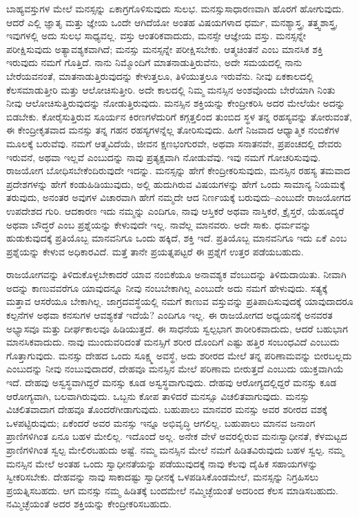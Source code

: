 \vskip 5pt

ಬಾಹ್ಯವಸ್ತುಗಳ ಮೇಲೆ ಮನಸ್ಸನ್ನು ಏಕಾಗ್ರಗೊಳಿಸುವುದು ಸುಲಭ. ಮನಸ್ಸು\break ಸಾಧಾರಣವಾಗಿ ಹೊರಗೆ ಹೋಗುವುದು. ಆದರೆ ಎಲ್ಲಿ ಜ್ಞಾತೃ ಮತ್ತು ಜ್ಞೇಯ ಒಂದೇ ಆಗಿದೆಯೋ ಅಂತಹ ವಿಷಯಗಳಾದ ಧರ್ಮ, ಮನಶ್ಯಾಸ್ತ್ರ, ತತ್ತ್ವಶಾಸ್ತ್ರ, ಇವುಗಳಲ್ಲಿ ಅದು ಸುಲಭ ಸಾಧ್ಯವಲ್ಲ. ವಸ್ತು ಆಂತರಿಕವಾದುದು, ಮನಸ್ಸೇ ಆಜ್ಞೇಯ ವಸ್ತು. ಮನಸ್ಸನ್ನೇ ಪರೀಕ್ಷಿಸುವುದು ಅತ್ಯಾವಶ್ಯಕವಾಗಿದೆ; ಮನಸ್ಸು ಮನಸ್ಸನ್ನೇ ಪರೀಕ್ಷಿಸಬೇಕು. ಆತ್ಮಚಿಂತನೆ ಎಂಬ ಮಾನಸಿಕ ಶಕ್ತಿ ಇರುವುದು ನಮಗೆ ಗೊತ್ತಿದೆ. ನಾನು ನಿಮ್ಮೊಂದಿಗೆ ಮಾತನಾಡುತ್ತಿರುವೆನು, ಅದೇ ಸಮಯದಲ್ಲಿ ನಾನು ಬೇರೆಯವನಂತೆ, ಮಾತನಾಡುತ್ತಿರುವುದನ್ನು ಕೇಳುತ್ತಲೂ, ತಿಳಿಯುತ್ತಲೂ ಇರುವೆನು. ನೀವು ಏಕಕಾಲದಲ್ಲಿ ಕೆಲಸಮಾಡುತ್ತೀರಿ ಮತ್ತು ಆಲೋಚಿಸುತ್ತೀರಿ. ಅದೇ ಕಾಲದಲ್ಲಿ ನಿಮ್ಮ ಮನಸ್ಸಿನ ಅಂಶವೊಂದು ಬೇರೆಯಾಗಿ ನಿಂತು ನೀವು ಆಲೋಚಿಸುತ್ತಿರುವುದನ್ನು ನೋಡುತ್ತಿರುವುದು. ಮನಸ್ಸಿನ ಶಕ್ತಿಯನ್ನು ಕೇಂದ್ರೀಕರಿಸಿ ಅದರ ಮೇಲೆಯೇ ಅದನ್ನು ಬಿಡಬೇಕು. ಕೋರೈಸುತ್ತಿರುವ ಸೂರ್ಯನ ಕಿರಣಗಳೆದುರಿಗೆ ಕಗ್ಗತ್ತಲಿಂದ ತುಂಬಿದ ಸ್ಥಳ ತನ್ನ ರಹಸ್ಯವನ್ನು ತೋರುವಂತೆ, ಈ ಕೇಂದ್ರೀಕೃತವಾದ ಮನಸ್ಸು ತನ್ನ ಗಹನ ರಹಸ್ಯಗಳನ್ನೆಲ್ಲ ತೋರಿಸುವುದು. ಹೀಗೆ ನಿಜವಾದ ಆಧ್ಯಾತ್ಮಿಕ ನಂಬಿಕೆಗಳ ಮೂಲಕ್ಕೆ ಬರುವೆವು. ನಮಗೆ ಆತ್ಮವಿದೆಯೆ, ಜೀವನ ಕ್ಷಣಭಂಗುರವೇ, ಅಥವಾ ಸನಾತನವೇ, ಪ್ರಪಂಚದಲ್ಲಿ ದೇವರು ಇರುವನೆ, ಅಥವಾ ಇಲ್ಲವೆ ಎಂಬುದನ್ನು ನಾವು ಪ್ರತ್ಯಕ್ಷವಾಗಿ ನೋಡುವೆವು. ಇವು ನಮಗೆ ಗೋಚರಿಸುವುವು. ರಾಜಯೋಗ ಬೋಧಿಸಬೇಕೆಂದಿರುವುದೇ ಇದನ್ನು. ಮನಸ್ಸನ್ನು ಹೇಗೆ ಕೇಂದ್ರೀಕರಿಸುವುದು, ಮನಸ್ಸಿನ ರಹಸ್ಯ ತಮವಾದ ಪ್ರದೇಶಗಳನ್ನು ಹೇಗೆ ಕಂಡುಹಿಡಿಯುವುದು, ಅಲ್ಲಿ ಹುದುಗಿರುವ ವಿಷಯಗಳನ್ನು ಹೇಗೆ ಒಂದು ಸಾಮಾನ್ಯ ನಿಯಮಕ್ಕೆ ತರುವುದು, ಅನಂತರ ಅವುಗಳ ವಿಚಾರವಾಗಿ ಹೇಗೆ ನಮ್ಮದೇ ಆದ ನಿರ್ಣಯಕ್ಕೆ ಬರುವುದು–ಎಂಬುದೇ ರಾಜಯೋಗದ ಉಪದೇಶದ ಗುರಿ. ಆದಕಾರಣ ಇದು ನಮ್ಮನ್ನು ಎಂದಿಗೂ, ನಾವು ಆಸ್ತಿಕರೆ ಅಥವಾ ನಾಸ್ತಿಕರೆ, ಕ್ರೈಸ್ತರೆ, ಯೆಹೂದ್ಯರೆ ಅಥವಾ ಬೌದ್ಧರೆ ಎಂಬ ಪ್ರಶ್ನೆಯನ್ನು ಕೇಳುವುದೇ ಇಲ್ಲ. ನಾವೆಲ್ಲ ಮಾನವರು. ಅದೇ ಸಾಕು. ಧರ್ಮವನ್ನು ಹುಡುಕುವುದಕ್ಕೆ ಪ್ರತಿಯೊಬ್ಬ ಮಾನವನಿಗೂ ಒಂದು ಹಕ್ಕಿದೆ, ಶಕ್ತಿ ಇದೆ. ಪ್ರತಿಯೊಬ್ಬ ಮಾನವನಿಗೂ ಇದು ಏಕೆ ಎಂಬ ಪ್ರಶ್ನೆಯನ್ನು ಕೇಳುವ ಅಧಿಕಾರವಿದೆ. ಮತ್ತೆ ತಾನೇ ಪ್ರಯತ್ನಪಟ್ಟರೆ ಈ ಪ್ರಶ್ನೆಗೆ ಉತ್ತರ ಪಡೆಯಬಹುದು. 

\vskip 5pt

ರಾಜಯೋಗವನ್ನು ತಿಳಿದುಕೊಳ್ಳಬೇಕಾದರೆ ಯಾವ ನಂಬಿಕೆಯೂ ಅನಾವಶ್ಯಕ ವೆಂಬುದನ್ನು ತಿಳಿದುದಾಯಿತು. ನೀವಾಗಿ ಅದನ್ನು ಕಾಣುವವರೆಗೂ ಯಾವುದನ್ನೂ ನೀವು ನಂಬಬೇಕಾಗಿಲ್ಲ ಎಂಬುದೇ ಅದು ನಮಗೆ ಹೇಳುವುದು. ಸತ್ಯಕ್ಕೆ ಮತ್ತಾವ ಆಸರೆಯೂ ಬೇಕಾಗಿಲ್ಲ. ಜಾಗ್ರದವಸ್ಥೆಯಲ್ಲಿ ನಮಗೆ ಕಾಣುವ ವಸ್ತುವನ್ನು ಪ್ರತಿಪಾದಿಸುವುದಕ್ಕೆ ಯಾವುದಾದರೂ ಕಲ್ಪನೆಗಳ ಅಥವಾ ಕನಸುಗಳ ಆವಶ್ಯಕತೆ ಇದೆಯೆ? ಎಂದಿಗೂ ಇಲ್ಲ. ಈ ರಾಜಯೋಗದ ಅಧ್ಯಯನಕ್ಕೆ ಅನವರತ ಅಭ್ಯಾಸವೂ ಮತ್ತು ದೀರ್ಘಕಾಲವೂ ಹಿಡಿಯುತ್ತದೆ. ಈ ಸಾಧನೆಯ ಸ್ವಲ್ಪಭಾಗ ಶಾರೀರಿಕವಾದುದು, ಆದರೆ ಬಹುಭಾಗ ಮಾನಸಿಕವಾದುದು. ನಾವು ಮುಂದುವರಿದಂತೆ ಮನಸ್ಸಿಗೆ ಶರೀರ ದೊಂದಿಗೆ ಎಷ್ಟು ಹತ್ತಿರ ಸಂಬಂಧವಿದೆ ಎಂಬುದು ಗೊತ್ತಾಗುವುದು. ಮನಸ್ಸು ದೇಹದ ಒಂದು ಸೂಕ್ಷ್ಮ ಅವಸ್ಥೆ, ಅದು ಶರೀರದ ಮೇಲೆ ತನ್ನ ಪರಿಣಾಮವನ್ನು ಬೀರಬಲ್ಲದು ಎಂಬುದನ್ನು ನೀವು ನಂಬುವುದಾದರೆ, ದೇಹವೂ ಮನಸ್ಸಿನ ಮೇಲೆ ಪರಿಣಾಮ ಬೀರುತ್ತದೆ ಎಂಬುದು ಯುಕ್ತವಾಗಿಯೆ ಇದೆ. ದೇಹವು ಅಸ್ವಸ್ಥವಾಗಿದ್ದರೆ ಮನಸ್ಸು ಕೂಡ ಅಸ್ವಸ್ಥವಾಗುವುದು. ದೇಹವು ಆರೋಗ್ಯದಲ್ಲಿದ್ದರೆ ಮನಸ್ಸು ಕೂಡ ಆರೋಗ್ಯವಾಗಿ, ಬಲವಾಗಿರುವುದು. ಒಬ್ಬನು ಕೋಪ ತಾಳಿದರೆ ಮನಸ್ಸೂ ವಿಚಲಿತವಾಗುವುದು. ಮನಸ್ಸು ವಿಚಲಿತವಾದಾಗ ದೇಹವೂ ತೊಂದರೆಗೀಡಾಗುವುದು. ಬಹುಪಾಲು ಮಾನವರ ಮನಸ್ಸು ಅವರ ಶರೀರದ ವಶಕ್ಕೆ ಒಳಪಟ್ಟಿರುವುದು; ಏಕೆಂದರೆ ಅವರ ಮನಸ್ಸು ಇನ್ನೂ ಅಭಿವೃದ್ಧಿ ಆಗಲಿಲ್ಲ. ಬಹುಪಾಲು ಮಾನವ ಜನಾಂಗ ಪ್ರಾಣಿಗಳಿಗಿಂತ ಏನೂ ಬಹಳ ಮೇಲಿಲ್ಲ. ಇದೊಂದೆ ಅಲ್ಲ. ಅನೇಕ ವೇಳೆ ಅವರಲ್ಲಿರುವ ಮನಃಸ್ವಾಧೀನತೆ, ಕೆಳಮಟ್ಟದ ಪ್ರಾಣಿಗಳಿಗಿಂತ ಸ್ವಲ್ಪ ಮೇಲಿರಬಹುದು ಅಷ್ಟೆ. ನಮ್ಮ ಮನಸ್ಸಿನ ಮೇಲೆ ನಮಗೆ ಹಿಡಿತವಿರುವುದು ಬಹಳ ಸ್ವಲ್ಪ. ನಮ್ಮ ಮನಸ್ಸಿನ ಮೇಲೆ ಅಂತಹ ಒಂದು ಸ್ವಾಧೀನತೆಯನ್ನು ಪಡೆಯುವುದಕ್ಕೆ ನಾವು ಕೆಲವು ದೈಹಿಕ ಸಹಾಯಗಳನ್ನು ಸ್ವೀಕರಿಸಬೇಕು. ದೇಹವನ್ನು ನಾವು ಸಾಕಾದಷ್ಟು ಸ್ವಾಧೀನಕ್ಕೆ ಒಳಪಡಿಸಿಕೊಂಡಮೇಲೆ, ಮನಸ್ಸನ್ನು ನಿಗ್ರಹಿಸಲು ಪ್ರಯತ್ನಿಸಬಹದು. ಆಗ ಮನಸ್ಸು ನಮ್ಮ ಹಿಡಿತಕ್ಕೆ ಬಂದಮೇಲೆ ನಮ್ಮಿಚ್ಛೆಯಂತೆ ಅದರಿಂದ ಕೆಲಸ ಮಾಡಿಸಬಹುದು. ನಮ್ಮಿಚ್ಛೆಯಂತೆ ಅದರ ಶಕ್ತಿಯನ್ನು ಕೇಂದ್ರೀಕರಿಸಬಹುದು. 

